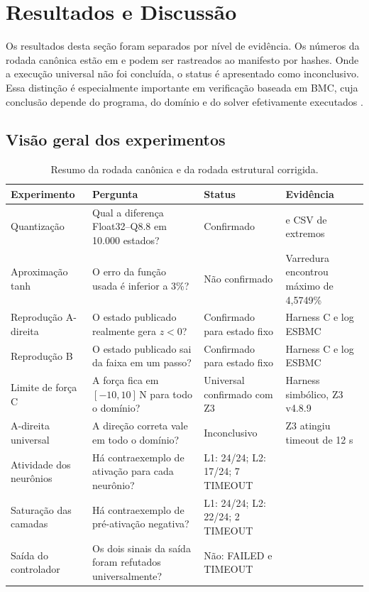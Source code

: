 \chapter{Resultados e Discussão}
\label{chap:resultados}

Os resultados desta seção foram separados por nível de evidência. Os números da
rodada canônica estão em  e podem ser
rastreados ao manifesto por hashes. Onde a execução universal não foi concluída,
o status é apresentado como inconclusivo. Essa distinção é especialmente
importante em verificação baseada em BMC, cuja conclusão depende do programa,
do domínio e do solver efetivamente executados .

\section{Visão geral dos experimentos}

\begin{table}[H]
\centering
\caption{Resumo da rodada canônica e da rodada estrutural corrigida.}
\label{tab:resumo-experimentos}
\begin{tabularx}{\textwidth}{p{}p{}p{}Y}
\toprule
Experimento & Pergunta & Status & Evidência \\
\midrule
Quantização & Qual a diferença Float32--Q8.8 em 10.000 estados? & Confirmado &  e CSV de extremos \\
Aproximação tanh & O erro da função usada é inferior a 3\%? & Não confirmado & Varredura encontrou máximo de 4,5749\% \\
Reprodução A-direita & O estado publicado realmente gera \(z<0\)? & Confirmado para estado fixo & Harness C e log ESBMC \\
Reprodução B & O estado publicado sai da faixa em um passo? & Confirmado para estado fixo & Harness C e log ESBMC \\
Limite de força C & A força fica em \([-10,10]\,\mathrm{N}\) para todo o domínio? & Universal confirmado com Z3 & Harness simbólico, Z3 v4.8.9 \\
A-direita universal & A direção correta vale em todo o domínio? & Inconclusivo & Z3 atingiu timeout de 12 s \\
Atividade dos neurônios & Há contraexemplo de ativação para cada neurônio? & L1: 24/24; L2: 17/24; 7 TIMEOUT &  \\
Saturação das camadas & Há contraexemplo de pré-ativação negativa? & L1: 24/24; L2: 22/24; 2 TIMEOUT &  \\
Saída do controlador & Os dois sinais da saída foram refutados universalmente? & Não: FAILED e TIMEOUT &  \\
\bottomrule
\end{tabularx}
\end{table}

